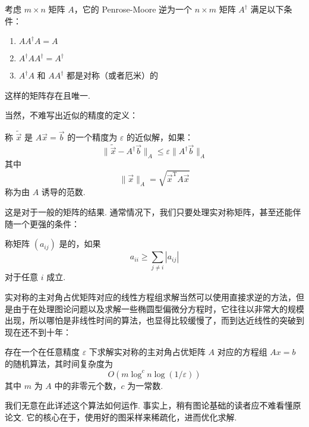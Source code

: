 \begin{definition}
    考虑 $m \times n$ 矩阵 $A$，它的 Penrose-Moore 逆为一个 $n \times m$ 矩阵 $A^\dagger$ 满足以下条件：

    \begin{enumerate}
        \item $A A^\dagger A = A$

        \item $A^\dagger A A^\dagger = A^\dagger$

        \item $A^\dagger A$ 和 $AA^\dagger$ 都是对称（或者厄米）的
    \end{enumerate}

    这样的矩阵存在且唯一.
\end{definition}

当然，不难写出近似的精度的定义：

\begin{definition}
    称 $\widetilde{\vec{x}}$ 是 $A\vec{x} = \vec{b}$ 的一个精度为 $\varepsilon$ 的近似解，如果：
    \[ \lVert \widetilde{\vec{x}} - A^\dagger \vec{b} \rVert_A \leqslant \varepsilon \lVert A^\dagger \vec{b} \rVert_A \]
    其中
    \[ \lVert \vec{x} \rVert_A = \sqrt{\vec{x}^\mathrm{T}A\vec{x}} \]
    称为由 $A$ 诱导的范数.
\end{definition}

这是对于一般的矩阵的结果. 通常情况下，我们只要处理实对称矩阵，甚至还能伴随一个更强的条件：

\begin{definition} 
    称矩阵 $(a_{ij})$ 是的，如果
    \[ a_{ii} \geqslant \sum_{j \neq i} |a_{ij}| \]
    对于任意 $i$ 成立.
\end{definition}

实对称的主对角占优矩阵对应的线性方程组求解当然可以使用直接求逆的方法，但是由于在处理图论问题以及求解一些椭圆型偏微分方程时，它往往以非常大的规模出现，所以哪怕是非线性时间的算法，也显得比较缓慢了，而到达近线性的突破到现在还不到十年：

\begin{theorem}
    存在一个在任意精度 $\varepsilon$ 下求解实对称的主对角占优矩阵 $A$ 对应的方程组 $Ax = b$ 的随机算法，其时间复杂度为
    \[ O(m \log^c n \log(1 / \varepsilon)) \]
    其中 $m$ 为 $A$ 中的非零元个数，$c$ 为一常数.
\end{theorem}

我们无意在此详述这个算法如何运作. 事实上，稍有图论基础的读者应不难看懂原论文. 它的核心在于，使用好的图采样来稀疏化，进而优化求解.

